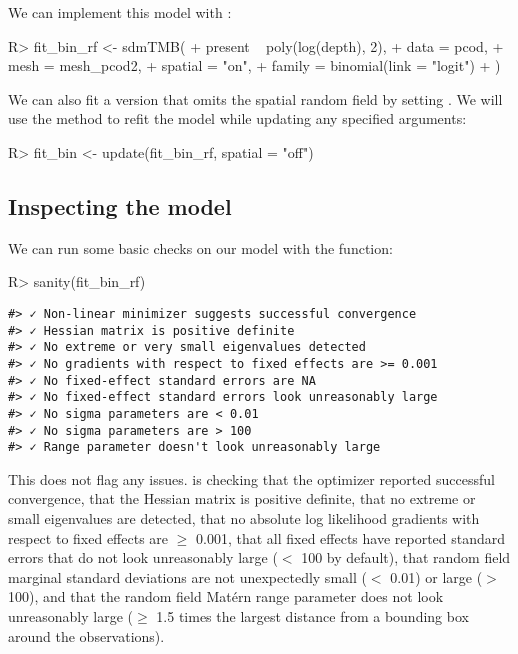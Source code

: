 \documentclass[article]{jss}\usepackage[]{graphicx}\usepackage[dvipsnames]{xcolor}
\newcommand{\fct}[1]{\code{#1()}}
\begin{document}
We can implement this model with \fct{sdmTMB}:

\begin{Schunk}
\begin{Sinput}
R> fit_bin_rf <- sdmTMB(
+    present ~ poly(log(depth), 2),
+    data = pcod,
+    mesh = mesh_pcod2,
+    spatial = "on",
+    family = binomial(link = "logit")
+  )
\end{Sinput}
\end{Schunk}

We can also fit a version that omits the spatial random field by setting .
We will use the \fct{update} method to refit the model while updating any specified arguments:

\begin{Schunk}
\begin{Sinput}
R> fit_bin <- update(fit_bin_rf, spatial = "off")
\end{Sinput}
\end{Schunk}

\subsection{Inspecting the model}

We can run some basic checks on our model with the \fct{sanity} function:

\begin{Schunk}
\begin{Sinput}
R> sanity(fit_bin_rf)
\end{Sinput}
\end{Schunk}

\begin{verbatim}
#> ✓ Non-linear minimizer suggests successful convergence
#> ✓ Hessian matrix is positive definite
#> ✓ No extreme or very small eigenvalues detected
#> ✓ No gradients with respect to fixed effects are >= 0.001
#> ✓ No fixed-effect standard errors are NA
#> ✓ No fixed-effect standard errors look unreasonably large
#> ✓ No sigma parameters are < 0.01
#> ✓ No sigma parameters are > 100
#> ✓ Range parameter doesn't look unreasonably large
\end{verbatim}

This does not flag any issues. \fct{sanity} is checking that the \fct{nlminb} optimizer reported successful convergence,
that the Hessian matrix is positive definite,
that no extreme or small eigenvalues are detected,
that no absolute log likelihood gradients with respect to fixed effects are $\ge$ 0.001,
that all fixed effects have reported standard errors that do not look unreasonably large ($<$ 100 by default),
that random field marginal standard deviations are not unexpectedly small ($<$ 0.01) or large ($>$ 100),
and that the random field Matérn range parameter does not look unreasonably large ($\ge$ 1.5 times the largest distance from a bounding box around the observations).
\end{document}
